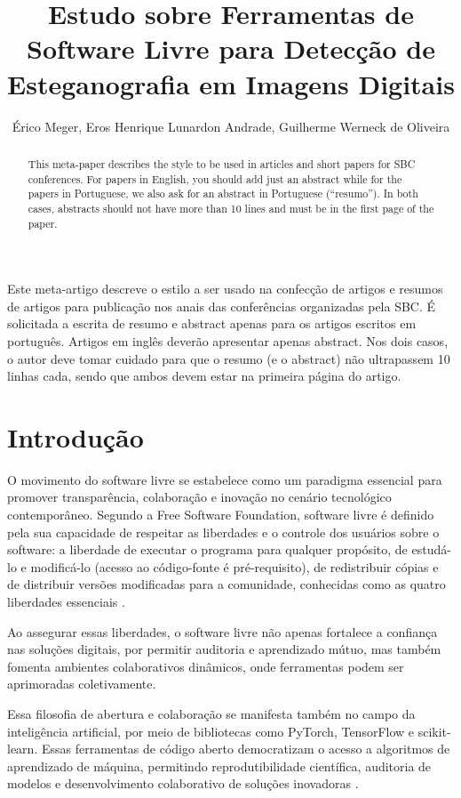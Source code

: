 \documentclass[12pt]{article}
\title{Estudo sobre Ferramentas de Software Livre para Detecção de Esteganografia em Imagens Digitais}
\author{Érico Meger\inst{1}, Eros Henrique Lunardon Andrade\inst{1}, Guilherme Werneck de Oliveira\inst{1}}
\begin{document}
\maketitle

\begin{abstract}
  This meta-paper describes the style to be used in articles and short papers
  for SBC conferences. For papers in English, you should add just an abstract
  while for the papers in Portuguese, we also ask for an abstract in
  Portuguese (``resumo''). In both cases, abstracts should not have more than
  10 lines and must be in the first page of the paper.
\end{abstract}

\begin{resumo}
  Este meta-artigo descreve o estilo a ser usado na confecção de artigos e
  resumos de artigos para publicação nos anais das conferências organizadas
  pela SBC. É solicitada a escrita de resumo e abstract apenas para os artigos
  escritos em português. Artigos em inglês deverão apresentar apenas abstract.
  Nos dois casos, o autor deve tomar cuidado para que o resumo (e o abstract)
  não ultrapassem 10 linhas cada, sendo que ambos devem estar na primeira
  página do artigo.
\end{resumo}

\section{Introdução}

O movimento do software livre se estabelece como um paradigma essencial para
promover transparência, colaboração e inovação no cenário tecnológico
contemporâneo. Segundo a Free Software Foundation, software livre é definido
pela sua capacidade de respeitar as liberdades e o controle dos usuários sobre
o software: a liberdade de executar o programa para qualquer propósito, de
estudá-lo e modificá-lo (acesso ao código-fonte é pré-requisito), de
redistribuir cópias e de distribuir versões modificadas para a comunidade,
conhecidas como as quatro liberdades essenciais \cite{gnu_freesw}.

Ao assegurar essas liberdades, o software livre não apenas fortalece a
confiança nas soluções digitais, por permitir auditoria e aprendizado mútuo,
mas também fomenta ambientes colaborativos dinâmicos, onde ferramentas podem
ser aprimoradas coletivamente. 



Essa filosofia de abertura e colaboração se
manifesta também no campo da inteligência artificial, por meio de bibliotecas
como PyTorch, TensorFlow e scikit-learn. Essas ferramentas de código aberto
democratizam o acesso a algoritmos de aprendizado de máquina, permitindo
reprodutibilidade científica, auditoria de modelos e desenvolvimento
colaborativo de soluções inovadoras \cite{pytorch_about, tensorflow_about}.
\end{document}

